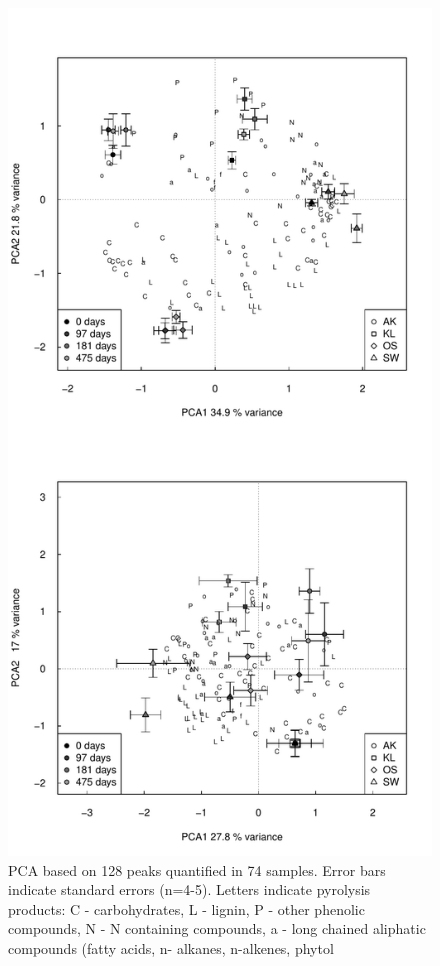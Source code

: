 \documentclass[preprint,review,12pt]{elsarticle}
\begin{document}
\newpage
\begin{figure}[h!]
\begin{center}
\includegraphics{aap-pca1}
\end{center}
\caption{PCA based on 128 peaks quantified in 74 samples. Error bars indicate standard errors (n=4-5). Letters indicate pyrolysis products:  C - carbohydrates, L - lignin, P - other phenolic compounds, N - N containing compounds,  a - long chained aliphatic compounds (fatty acids, n- alkanes, n-alkenes, phytol}
\label{fig:pca1}
\end{figure}
\end{document}
